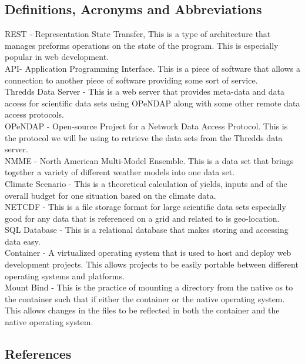 \documentclass[onecolumn, draftclsnofoot,10pt, compsoc]{article}
\begin{document}
		\subsection{Definitions, Acronyms and Abbreviations}
			REST - Representation State Transfer, This is a type of architecture that manages preforms operations on the state of the program. This is especially popular in web development.\\
			API- Application Programming Interface. This is a piece of software that allows a connection to another piece of software providing some sort of service.\\
			Thredds Data Server - This is a web server that provides meta-data and data access for scientific data sets using OPeNDAP along with some other remote data access protocols.\\
			OPeNDAP - Open-source Project for a Network Data Access Protocol. This is the protocol we will be using to retrieve the data sets from the Thredds data server.\\
			NMME - North American Multi-Model Ensemble. This is a data set that brings together a variety of different weather models into one data set.\\
			Climate Scenario - This is a theoretical calculation of yields, inputs and of the overall budget for one situation based on the climate data.\\
			NETCDF - This is a file storage format for large scientific data sets especially good for any data that is referenced on a grid and related to is geo-location.\\
			SQL Database - This is a relational database that makes storing and accessing data easy.\\
			Container - A virtualized operating system that is used to host and deploy web development projects. This allows projects to be easily portable between different operating systems and platforms.\\
			Mount Bind - This is the practice of mounting a directory from the native os to the container such that if either the container or the native operating system. This allows changes in the files to be reflected in both the container and the native operating system.\\


			\renewcommand\refname{\vskip -1cm}
		\subsection{References}
\end{document}
